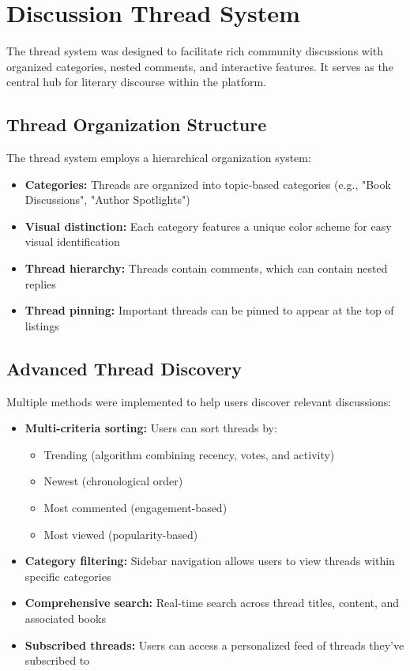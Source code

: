 \documentclass{article}
\begin{document}
\section{Discussion Thread System}
The thread system was designed to facilitate rich community discussions with organized categories, nested comments, and interactive features. It serves as the central hub for literary discourse within the platform.

\subsection{Thread Organization Structure}
The thread system employs a hierarchical organization system:
\begin{itemize}
    \item \textbf{Categories:} Threads are organized into topic-based categories (e.g., "Book Discussions", "Author Spotlights")
    \item \textbf{Visual distinction:} Each category features a unique color scheme for easy visual identification
    \item \textbf{Thread hierarchy:} Threads contain comments, which can contain nested replies
    \item \textbf{Thread pinning:} Important threads can be pinned to appear at the top of listings
\end{itemize}

\subsection{Advanced Thread Discovery}
Multiple methods were implemented to help users discover relevant discussions:
\begin{itemize}
    \item \textbf{Multi-criteria sorting:} Users can sort threads by:
    \begin{itemize}
        \item Trending (algorithm combining recency, votes, and activity)
        \item Newest (chronological order)
        \item Most commented (engagement-based)
        \item Most viewed (popularity-based)
    \end{itemize}
    \item \textbf{Category filtering:} Sidebar navigation allows users to view threads within specific categories
    \item \textbf{Comprehensive search:} Real-time search across thread titles, content, and associated books
    \item \textbf{Subscribed threads:} Users can access a personalized feed of threads they've subscribed to
\end{itemize}
\end{document}
